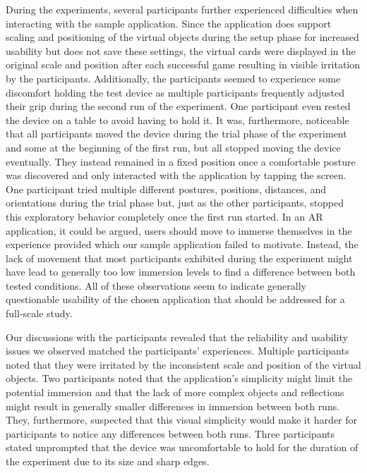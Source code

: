 \documentclass[12pt,twoside,english]{article}
\begin{document}
During the experiments, several participants further experienced difficulties when interacting with the sample application.
Since the application does support scaling and positioning of the virtual objects during the setup phase for increased usability but does not save these settings, the virtual cards were displayed in the original scale and position after each successful game resulting in visible irritation by the participants.
Additionally, the participants seemed to experience some discomfort holding the test device as multiple participants frequently adjusted their grip during the second run of the experiment.
One participant even rested the device on a table to avoid having to hold it.
It was, furthermore, noticeable that all participants moved the device during the trial phase of the experiment and some at the beginning of the first run, but all stopped moving the device eventually.
They instead remained in a fixed position once a comfortable posture was discovered and only interacted with the application by tapping the screen.
One participant tried multiple different postures, positions, distances, and orientations during the trial phase but, just as the other participants, stopped this exploratory behavior completely once the first run started.
In an \gls{AR} application, it could be argued, users should move to immerse themselves in the experience provided which our sample application failed to motivate.
Instead, the lack of movement that most participants exhibited during the experiment might have lead to generally too low immersion levels to find a difference between both tested conditions.
All of these observations seem to indicate generally questionable usability of the chosen application that should be addressed for a full-scale study.

Our discussions with the participants revealed that the reliability and usability issues we observed matched the participants' experiences.
Multiple participants noted that they were irritated by the inconsistent scale and position of the virtual objects.
Two participants noted that the application's simplicity might limit the potential immersion and that the lack of more complex objects and reflections might result in generally smaller differences in immersion between both runs.
They, furthermore, suspected that this visual simplicity would make it harder for participants to notice any differences between both runs.
Three participants stated unprompted that the device was uncomfortable to hold for the duration of the experiment due to its size and sharp edges.
\end{document}
